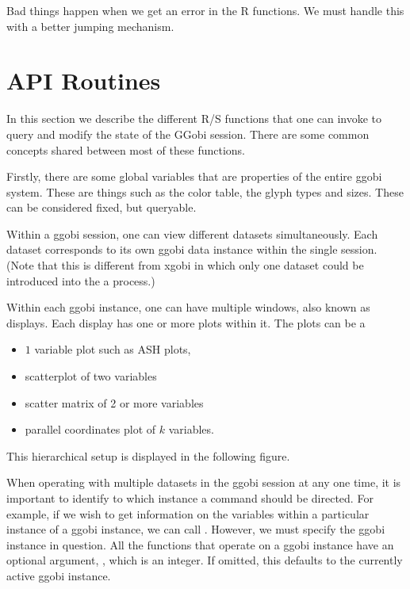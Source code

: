\documentclass{article}
\begin{document}
Bad things happen when we get an error in the R functions.  We must
handle this with a better jumping mechanism.


\section{API Routines}
In this section we describe the different R/S functions that one can
invoke to query and modify the state of the GGobi session.  There are
some common concepts shared between most of these functions.

Firstly, there are some global variables that are properties of the
entire ggobi system.  These are things such as the color table, the
glyph types and sizes.  These can be considered fixed, but queryable.

Within a ggobi session, one can view different datasets
simultaneously. Each dataset corresponds to its own ggobi data
instance within the single session.  (Note that this is different from
xgobi in which only one dataset could be introduced into the a
process.)

Within each ggobi instance, one can have multiple windows, also known
as displays.  Each display has one or more plots within it.  The plots
can be a
\begin{itemize}
\item $1$ variable plot
such as ASH plots,
\item  scatterplot of two variables
\item scatter matrix of 2 or more variables
\item parallel coordinates plot of $k$ variables.
\end{itemize}

This hierarchical setup is displayed in the following
figure.
\begin{center}
\end{center}

When operating with multiple datasets in the ggobi session at any one
time, it is important to identify to which instance a command should
be directed.  For example, if we wish to get information on the
variables within a particular instance of a ggobi instance, we can
call . However, we must
specify the ggobi instance in question. All the functions
that operate on a ggobi instance have an optional argument,
, which is an integer.
If omitted, this defaults to the currently active
ggobi instance.
\end{document}
